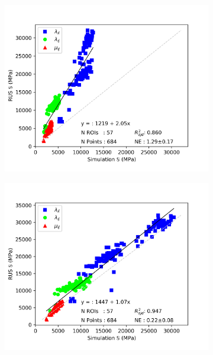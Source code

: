 \documentclass[a4paper,fleqn]{DC_ArtStyle}
\begin{document}
	\begin{figure}
		\begin{subfigure}[b]{0.45\linewidth}
			\includegraphics[width=\linewidth]{Elasticity_IsoRUS}
		\end{subfigure}
		\begin{subfigure}[b]{0.45\linewidth}
			\includegraphics[width=\linewidth]{Elasticity_TraRUS}
		\end{subfigure}
	\end{figure}
\end{document}
